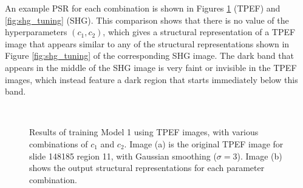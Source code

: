 \documentclass{report}
\begin{document}
An example PSR for each combination is shown in Figures \ref{fig:tpef_tuning} (TPEF) and \ref{fig:shg_tuning} (SHG). This comparison shows that there is no value of the hyperparameters $(c_1, c_2)$, which gives a structural representation of a TPEF image that appears similar to any of the structural representations shown in Figure \ref{fig:shg_tuning} of the corresponding SHG image. The dark band that appears in the middle of the SHG image is very faint or invisible in the TPEF images, which instead feature a dark region that starts immediately below this band.

\begin{figure}
\centering
{} \\

\caption{Results of training Model 1 using TPEF images, with various combinations of $c_1$ and $c_2$. Image (a) is the original TPEF image for slide 148185 region 11, with Gaussian smoothing ($\sigma=3$). Image (b) shows the output structural representations for each parameter combination.}
\label{fig:tpef_tuning}
\end{figure}
\end{document}

